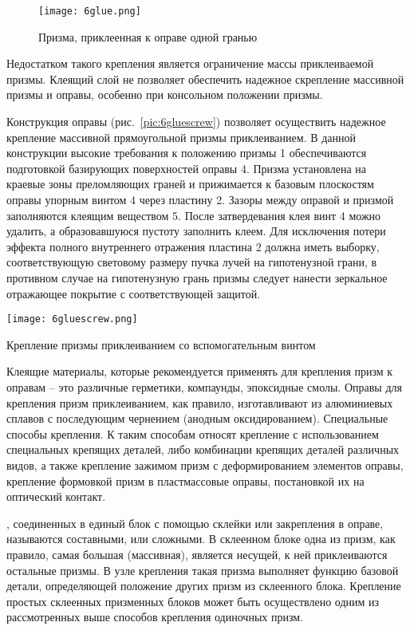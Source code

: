 \begin{figure}[h!]
	\begin{center}
		\texttt{[image: 6glue.png]}
		\caption{ Призма, приклеенная к оправе одной гранью }
		\label{pic:6glue}
	\end{center}
\end{figure} 

Недостатком такого крепления является ограничение массы приклеиваемой призмы.
Клеящий слой не позволяет обеспечить надежное скрепление массивной призмы и оправы, особенно при консольном положении призмы.

Конструкция оправы (рис.~\ref{pic:6gluescrew}) позволяет осуществить надежное крепление массивной прямоугольной призмы приклеиванием. В данной конструкции высокие требования к положению призмы 1 обеспечиваются подготовкой базирующих поверхностей оправы 4. Призма установлена на краевые зоны преломляющих граней и прижимается к базовым плоскостям оправы упорным винтом 4 через пластину 2. Зазоры между оправой и призмой заполняются клеящим веществом 5. После затвердевания клея винт 4 можно удалить, а образовавшуюся пустоту заполнить клеем. Для исключения потери эффекта полного внутреннего отражения пластина 2 должна иметь выборку, соответствующую световому размеру пучка лучей на гипотенузной грани, в противном случае на гипотенузную грань призмы следует нанести зеркальное отражающее покрытие с соответствующей защитой.
\begin{marginfigure}
	\begin{center}
		\texttt{[image: 6gluescrew.png]}
		\caption{ Крепление призмы приклеиванием со вспомогательным винтом }
		\label{pic:6gluescrew}
	\end{center}
\end{marginfigure}

Клеящие материалы, которые рекомендуется применять для крепления призм к оправам -- это различные герметики, компаунды, эпоксидные смолы.
Оправы для крепления призм приклеиванием, как правило, изготавливают из алюминиевых сплавов с последующим чернением (анодным оксидированием).
Специальные способы крепления. 
К таким способам относят крепление с использованием специальных крепящих деталей, либо комбинации крепящих деталей различных видов, а также крепление зажимом призм с деформированием элементов оправы, крепление формовкой призм в пластмассовые оправы, постановкой их на оптический контакт.

, соединенных в единый блок с помощью склейки или закрепления в оправе, называются составными, или сложными. В склеенном блоке одна из призм, как правило, самая большая (массивная), является несущей, к ней приклеиваются остальные призмы. В узле крепления такая призма выполняет функцию базовой детали, определяющей положение других призм из склеенного блока. Крепление простых склеенных призменных блоков может быть осуществлено одним из рассмотренных выше способов крепления одиночных призм.


